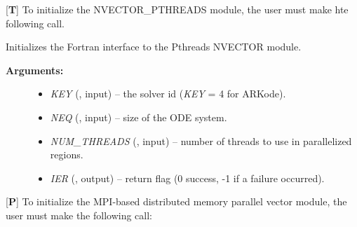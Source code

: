 \documentclass[letterpaper,10pt,english]{sphinxmanual}
\begin{document}
{[}\textbf{T}{]} To initialize the NVECTOR\_PTHREADS module, the user must
make hte following call.

\begin{fulllineitems}
\label{f_interface/Usage:f/_/FNVINITPTS}
Initializes the Fortran interface to the Pthreads NVECTOR module.
\begin{description}
\item[{\textbf{Arguments:}}] \leavevmode\begin{itemize}
\item {} 
\emph{KEY} (, input) -- the solver id (\emph{KEY} = 4 for ARKode).

\item {} 
\emph{NEQ} (, input) -- size of the ODE system.

\item {} 
\emph{NUM\_THREADS} (, input) -- number of threads to use in
parallelized regions.

\item {} 
\emph{IER} (, output) -- return flag (0 success, -1 if a
failure occurred).

\end{itemize}

\end{description}

\end{fulllineitems}


{[}\textbf{P}{]} To initialize the MPI-based distributed memory parallel vector
module, the user must make the following call:
\end{document}
